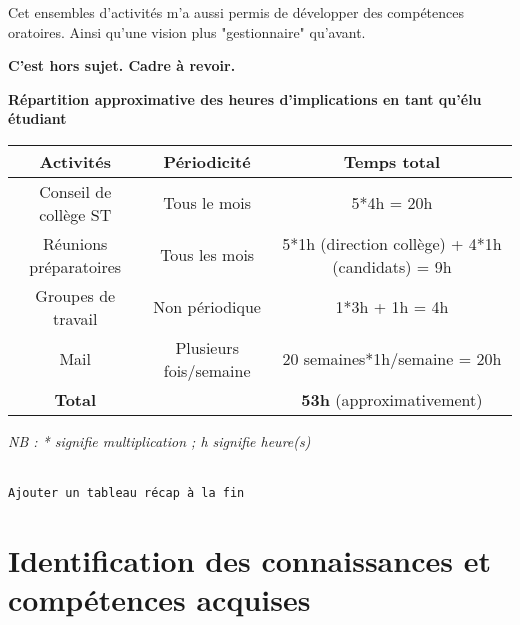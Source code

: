 \documentclass{article}
\begin{document}
Cet ensembles d'activités m'a aussi permis de développer des compétences oratoires. Ainsi qu'une vision plus "gestionnaire" qu'avant. 

\textbf{C'est hors sujet. Cadre à revoir.}


\begin{center}
\textbf{Répartition approximative des heures d'implications en tant qu'élu étudiant}
\vspace*{10pt}

\begin{tabular}{|c|c|c|}
\hline 
Activités & Périodicité & Temps total\\ 
\hline 
Conseil de collège ST & Tous le mois & 5*4h = 20h \\ 
\hline 
Réunions préparatoires & Tous les mois & 5*1h (direction collège) + 4*1h (candidats) = 9h\\ 
\hline 
Groupes de travail & Non périodique & 1*3h + 1h = 4h\\ 
\hline 
Mail & Plusieurs fois/semaine & 20 semaines*1h/semaine = 20h\\ 
\hline 
\textbf{Total} &  & \textbf{53h} (approximativement) \\ 
\hline 
\end{tabular} 
\end{center}
\textit{NB : * signifie multiplication ; h signifie heure(s)}


$ $ 
$ $ \\
$ $ \\
\texttt{Ajouter un tableau récap à la fin}
\newpage \section{Identification des connaissances et compétences acquises}
\end{document}
